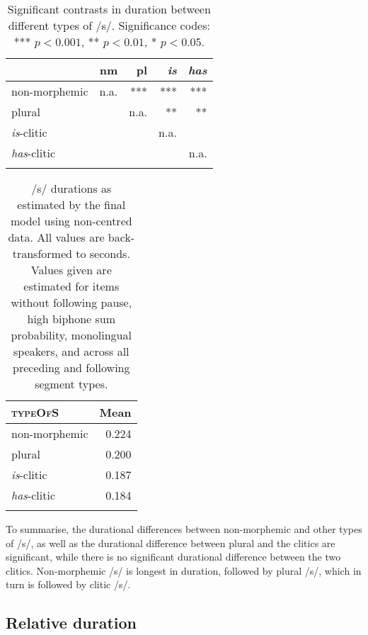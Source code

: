 \begin{table}\fontsize{10}{11}
\caption{Significant contrasts in duration between different types of /s/. Significance codes: *** $p < 0.001$, ** $p < 0.01$, * $p < 0.05$.}
\label{tab:4.7}
\centering
\begin{tabular}{lrrrr} 
\lsptoprule
~                   & nm   & pl   & \textit{is} & \textit{has}  \\ 
\midrule
non-morphemic       & n.a. & ***  & ***         & ***           \\
plural              & ~    & n.a. & **          & **            \\
\textit{is}-clitic  & ~    & ~    & n.a.        & ~             \\
\textit{has}-clitic & ~    & ~    & ~           & n.a.          \\
\lspbottomrule
\end{tabular}
\end{table}



\begin{table}\fontsize{10}{11}
\caption{/s/ durations as estimated by the final model using non-centred data. All values are back-transformed to seconds. Values given are estimated for items without following pause, high biphone sum probability, monolingual speakers, and across all preceding and following segment types.}
\label{tab:4.8}
\begin{tabular}{lr} 
\lsptoprule
\textsc{typeOfS}                      & Mean   \\ 
\midrule
non-morphemic                & 0.224  \\
plural                       & 0.200  \\
\textit{is}-clitic           & 0.187  \\
\textit{has}-clitic          & 0.184  \\
\lspbottomrule
\end{tabular}
\end{table}

To summarise, the durational differences between non-morphemic and other types of /s/, as well as the durational difference between plural and the clitics are significant, while there is no significant durational difference between the two clitics. Non-morphemic /s/ is longest in duration, followed by plural /s/, which in turn is followed by clitic /s/.

\subsection{Relative duration}\label{section04_3_2}

